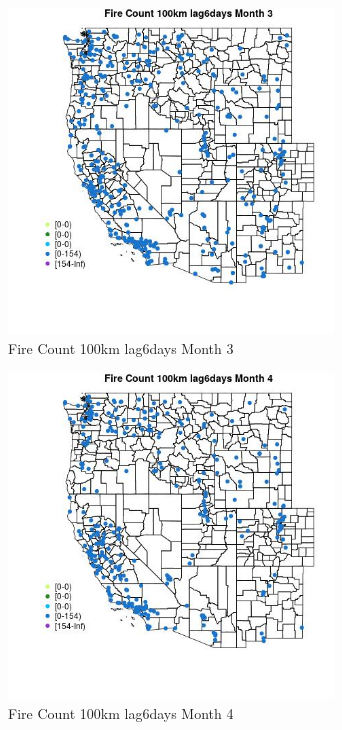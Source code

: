 \begin{figure} 
\centering  
\includegraphics[width=0.77\textwidth]{Code_Outputs/Report_ML_input_PM25_Step4_part_e_de_duplicated_aves_compiled_2019-05-18wNAs_MapObsMo3Fire_Count_100km_lag6days.jpg} 
\caption{\label{fig:Report_ML_input_PM25_Step4_part_e_de_duplicated_aves_compiled_2019-05-18wNAsMapObsMo3Fire_Count_100km_lag6days}Fire Count 100km lag6days Month 3} 
\end{figure} 
 

\clearpage 

\begin{figure} 
\centering  
\includegraphics[width=0.77\textwidth]{Code_Outputs/Report_ML_input_PM25_Step4_part_e_de_duplicated_aves_compiled_2019-05-18wNAs_MapObsMo4Fire_Count_100km_lag6days.jpg} 
\caption{\label{fig:Report_ML_input_PM25_Step4_part_e_de_duplicated_aves_compiled_2019-05-18wNAsMapObsMo4Fire_Count_100km_lag6days}Fire Count 100km lag6days Month 4} 
\end{figure} 
 

